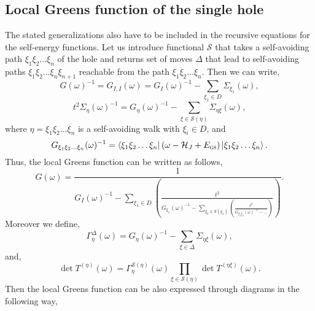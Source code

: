 \documentclass{article}
\newcommand{\ket}[1]{\left\vert #1 \right\rangle}
\newcommand{\bra}[1]{\left\langle #1 \right\vert}
\begin{document}
\subsection{Local Greens function of the single hole}
The stated generalizations also have to be included in the recursive equations for the self-energy functions. Let us introduce functional $\mathcal{S}$ that takes a self-avoiding path $\xi_1 \xi_2 \hdots \xi_n$ of the hole and returns set of moves $\Delta$ that lead to self-avoiding paths $\xi_1 \xi_2 \hdots \xi_{n} \xi_{n+1}$ reachable from the path $\xi_1 \xi_2 \hdots \xi_n$. Then we can write,
\begin{equation}
    G(\omega)^{-1} = G_{I,I}(\omega) = G_I(\omega)^{-1} - \sum_{\xi_1 \in D}\Sigma_{\xi_1}(\omega), 
\end{equation}
\begin{equation}
    t^2\Sigma_{\eta}(\omega)^{-1} = G_{\eta}(\omega)^{-1} - \sum_{\xi \in \mathcal{S}(\eta)}\Sigma_{\eta\xi}(\omega),
\end{equation}
where $\eta = \xi_1 \xi_2 \hdots \xi_{n}$ is a self-avoiding walk with $\xi_i \in D$, and
\begin{equation}
    G_{\xi_1 \xi_2 \hdots \xi_{n}}(\omega)^{-1} = 
    \bra{\xi_1 \xi_2 \hdots \xi_{n}}
    \left(
        \omega - \mathcal{H}_J + E_{\textsc{gs}}
    \right)
    \ket{\xi_1 \xi_2 \hdots \xi_{n}}.
\end{equation}
Thus, the local Greens function can be written as follows,
\begin{equation}
    G(\omega) = \frac{1}{
        G_I(\omega)^{-1} - 
        \sum_{\xi_1 \in D}\left(\frac{t^2}{
            G_{\xi_1}(\omega)^{-1} - 
            \sum_{\xi_2 \in \mathcal{S}(\xi_1)}\left(\frac{t^2}{
                G_{\xi_1\xi_2}(\omega)^{-1} - \hdots
            }\right)
        }\right)
    }.
\label{eq:SquareGF}
\end{equation}
Moreover we define,
\begin{equation}
    \Gamma_{\eta}^{\Delta}(\omega) = G_{\eta}(\omega)^{-1} - \sum_{\xi \in \Delta}\Sigma_{\eta\xi}(\omega),
\end{equation}
and,
\begin{equation}
    \det T^{(\eta)}(\omega) = 
        \Gamma_{\eta}^{\mathcal{S}(\eta)}(\omega)
        \prod_{\xi \in \mathcal{S}(\eta)}
        \det T^{(\eta\xi)}(\omega).
        \label{eq:det_recursive_gamma_square}
\end{equation}
Then the local Greens function can be also expressed through diagrams in the following way, \\
\end{document}
